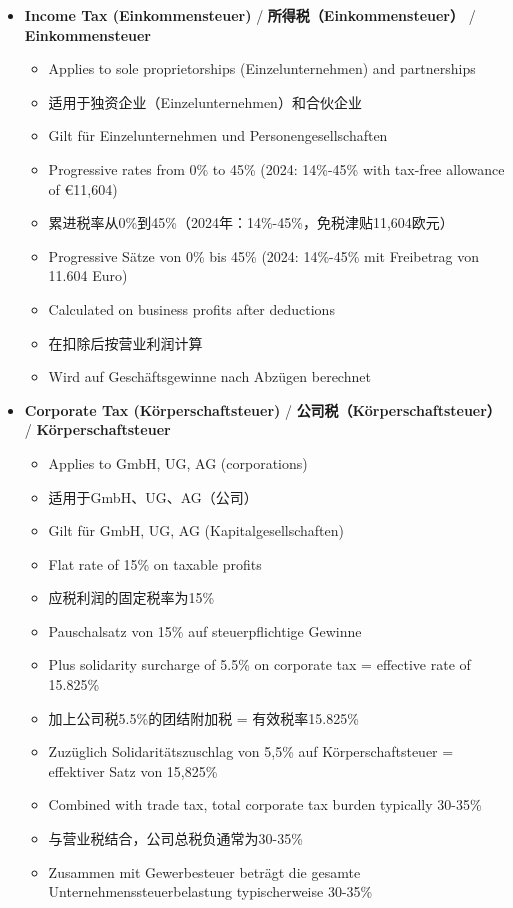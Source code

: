 \begin{itemize}
    \item \textbf{Income Tax (Einkommensteuer)} / \textbf{所得税（Einkommensteuer）} / \textbf{Einkommensteuer}
    \begin{itemize}
        \item Applies to sole proprietorships (Einzelunternehmen) and partnerships
        \item 适用于独资企业（Einzelunternehmen）和合伙企业
        \item Gilt für Einzelunternehmen und Personengesellschaften
        \item Progressive rates from 0\% to 45\% (2024: 14\%-45\% with tax-free allowance of €11,604)
        \item 累进税率从0\%到45\%（2024年：14\%-45\%，免税津贴11,604欧元）
        \item Progressive Sätze von 0\% bis 45\% (2024: 14\%-45\% mit Freibetrag von 11.604 Euro)
        \item Calculated on business profits after deductions
        \item 在扣除后按营业利润计算
        \item Wird auf Geschäftsgewinne nach Abzügen berechnet
    \end{itemize}
    
    \item \textbf{Corporate Tax (Körperschaftsteuer)} / \textbf{公司税（Körperschaftsteuer）} / \textbf{Körperschaftsteuer}
    \begin{itemize}
        \item Applies to GmbH, UG, AG (corporations)
        \item 适用于GmbH、UG、AG（公司）
        \item Gilt für GmbH, UG, AG (Kapitalgesellschaften)
        \item Flat rate of 15\% on taxable profits
        \item 应税利润的固定税率为15\%
        \item Pauschalsatz von 15\% auf steuerpflichtige Gewinne
        \item Plus solidarity surcharge of 5.5\% on corporate tax = effective rate of 15.825\%
        \item 加上公司税5.5\%的团结附加税 = 有效税率15.825\%
        \item Zuzüglich Solidaritätszuschlag von 5,5\% auf Körperschaftsteuer = effektiver Satz von 15,825\%
        \item Combined with trade tax, total corporate tax burden typically 30-35\%
        \item 与营业税结合，公司总税负通常为30-35\%
        \item Zusammen mit Gewerbesteuer beträgt die gesamte Unternehmenssteuerbelastung typischerweise 30-35\%
    \end{itemize}
    

\end{itemize}
